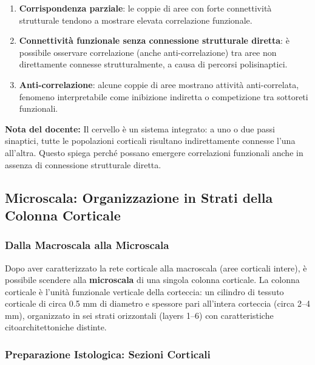\begin{enumerate}
    \item \textbf{Corrispondenza parziale}: le coppie di aree con forte connettività strutturale tendono a mostrare elevata correlazione funzionale.
    \item \textbf{Connettività funzionale senza connessione strutturale diretta}: è possibile osservare correlazione (anche anti-correlazione) tra aree non direttamente connesse strutturalmente, a causa di percorsi polisinaptici.
    \item \textbf{Anti-correlazione}: alcune coppie di aree mostrano attività anti-correlata, fenomeno interpretabile come inibizione indiretta o competizione tra sottoreti funzionali.
\end{enumerate}

\begin{tcolorbox}[colback=gray!5, colframe=gray!40, arc=2mm, boxrule=0.5pt]
\textbf{Nota del docente:} Il cervello è un sistema integrato: a uno o due passi sinaptici, tutte le popolazioni corticali risultano indirettamente connesse l'una all'altra. Questo spiega perché possano emergere correlazioni funzionali anche in assenza di connessione strutturale diretta.
\end{tcolorbox}

\subsection{Microscala: Organizzazione in Strati della Colonna Corticale}

\subsubsection{Dalla Macroscala alla Microscala}

Dopo aver caratterizzato la rete corticale alla macroscala (aree corticali intere), è possibile scendere alla \textbf{microscala} di una singola colonna corticale. La colonna corticale è l'unità funzionale verticale della corteccia: un cilindro di tessuto corticale di circa 0.5 mm di diametro e spessore pari all'intera corteccia (circa 2–4 mm), organizzato in sei strati orizzontali (layers 1–6) con caratteristiche citoarchitettoniche distinte.

\subsubsection{Preparazione Istologica: Sezioni Corticali}

